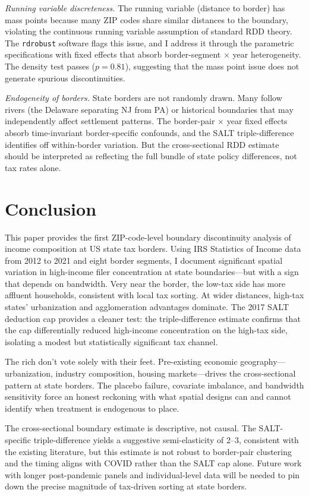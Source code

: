 \documentclass[12pt]{article}
\begin{document}
\textit{Running variable discreteness.} The running variable (distance to border) has mass points because many ZIP codes share similar distances to the boundary, violating the continuous running variable assumption of standard RDD theory. The \texttt{rdrobust} software flags this issue, and I address it through the parametric specifications with fixed effects that absorb border-segment $\times$ year heterogeneity. The density test passes ($p = 0.81$), suggesting that the mass point issue does not generate spurious discontinuities.

\textit{Endogeneity of borders.} State borders are not randomly drawn. Many follow rivers (the Delaware separating NJ from PA) or historical boundaries that may independently affect settlement patterns. The border-pair $\times$ year fixed effects absorb time-invariant border-specific confounds, and the SALT triple-difference identifies off within-border variation. But the cross-sectional RDD estimate should be interpreted as reflecting the full bundle of state policy differences, not tax rates alone.


\section{Conclusion}
\label{sec:conclusion}

This paper provides the first ZIP-code-level boundary discontinuity analysis of income composition at US state tax borders. Using IRS Statistics of Income data from 2012 to 2021 and eight border segments, I document significant spatial variation in high-income filer concentration at state boundaries---but with a sign that depends on bandwidth. Very near the border, the low-tax side has more affluent households, consistent with local tax sorting. At wider distances, high-tax states' urbanization and agglomeration advantages dominate. The 2017 SALT deduction cap provides a cleaner test: the triple-difference estimate confirms that the cap differentially reduced high-income concentration on the high-tax side, isolating a modest but statistically significant tax channel.

The rich don't vote solely with their feet. Pre-existing economic geography---urbanization, industry composition, housing markets---drives the cross-sectional pattern at state borders. The placebo failure, covariate imbalance, and bandwidth sensitivity force an honest reckoning with what spatial designs can and cannot identify when treatment is endogenous to place.

The cross-sectional boundary estimate is descriptive, not causal. The SALT-specific triple-difference yields a suggestive semi-elasticity of 2--3, consistent with the existing literature, but this estimate is not robust to border-pair clustering and the timing aligns with COVID rather than the SALT cap alone. Future work with longer post-pandemic panels and individual-level data will be needed to pin down the precise magnitude of tax-driven sorting at state borders.
\end{document}
